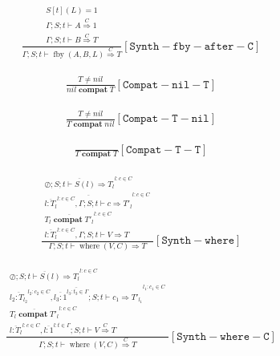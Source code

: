 \documentclass{scrartcl}
\DeclareMathOperator{\fby}{fby}
\DeclareMathOperator{\where}{where}
\DeclareMathOperator{\compat}{\mathbf{compat}}
\begin{document}
    \begin{align*}
    \frac{
        \begin{matrix}
        S[t](L) = 1 \\
        \Gamma; S; t \vdash A \overset{C}{\Rightarrow} 1 \\
        \Gamma; S; t \vdash B \overset{C}{\Rightarrow} T
        \end{matrix}
    }{
        \Gamma; S; t \vdash \fby(A, B, L) \overset{C}{\Rightarrow} T
    }[\mathtt{Synth-fby-after-C}]
    \end{align*}
    
    \begin{align*}
    \frac{
        T \neq nil
    }{
        nil \compat T
    }[\mathtt{Compat-nil-T}]
    \end{align*}
    
    \begin{align*}
    \frac{
        T \neq nil
    }{
        T \compat nil
    }[\mathtt{Compat-T-nil}]
    \end{align*}
    
    \begin{align*}
    \frac{}{
        T \compat T
    }[\mathtt{Compat-T-T}]
    \end{align*}
    
    \begin{align*}
    \frac{
        \begin{matrix}
        \overline{\oslash; S; t \vdash S(l) \Rightarrow T_l}^{l : c \in C} \\
        \overline{\overline{l : T_l}^{l : c \in C}, \Gamma; S; t \vdash c \Rightarrow T'_l}^{l : c \in C} \\
        \overline{T_l \compat T'_l}^{l : c \in C} \\
        \overline{l : T_l}^{l : c \in C}, \Gamma; S; t \vdash V \Rightarrow T
        \end{matrix}
    }{
        \Gamma; S; t \vdash \where(V, C) \Rightarrow T
    }[\mathtt{Synth-where}]
    \end{align*}
    
    \begin{align*}
    \frac{
        \begin{matrix}
        \overline{\oslash; S; t \vdash S(l) \Rightarrow T_l}^{l : c \in C} \\
        \overline{\overline{l_2 : T_{l_2}}^{l_2 : c_2 \in C}, \overline{l_3 : 1}^{l_3 : t_3 \in \Gamma}; S; t \vdash c_1 \Rightarrow T'_{l_1}}^{l_1: c_1 \in C} \\
        \overline{T_l \compat T'_l}^{l : c \in C} \\
        \overline{l : T_l}^{l: c \in C}, \overline{l : 1}^{l : t \in \Gamma}; S; t \vdash V \overset{C}{\Rightarrow} T
        \end{matrix}
    }{
        \Gamma; S; t \vdash \where(V, C) \overset{C}{\Rightarrow} T
    }[\mathtt{Synth-where-C}]
    \end{align*}
    
\end{document}
